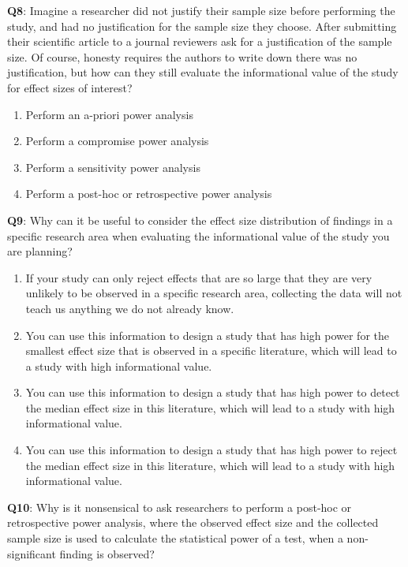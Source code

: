 \documentclass[
  oneside]{krantz}
\providecommand{\tightlist}{%
  \setlength{\itemsep}{0pt}\setlength{\parskip}{0pt}}
\begin{document}
\textbf{Q8}: Imagine a researcher did not justify their sample size before performing the study, and had no justification for the sample size they choose. After submitting their scientific article to a journal reviewers ask for a justification of the sample size. Of course, honesty requires the authors to write down there was no justification, but how can they still evaluate the informational value of the study for effect sizes of interest?

\begin{enumerate}
\def\labelenumi{\Alph{enumi})}
\tightlist
\item
  Perform an a-priori power analysis
\item
  Perform a compromise power analysis
\item
  Perform a sensitivity power analysis
\item
  Perform a post-hoc or retrospective power analysis
\end{enumerate}

\textbf{Q9}: Why can it be useful to consider the effect size distribution of findings in a specific research area when evaluating the informational value of the study you are planning?

\begin{enumerate}
\def\labelenumi{\Alph{enumi})}
\tightlist
\item
  If your study can only reject effects that are so large that they are very unlikely to be observed in a specific research area, collecting the data will not teach us anything we do not already know.
\item
  You can use this information to design a study that has high power for the smallest effect size that is observed in a specific literature, which will lead to a study with high informational value.
\item
  You can use this information to design a study that has high power to detect the median effect size in this literature, which will lead to a study with high informational value.
\item
  You can use this information to design a study that has high power to reject the median effect size in this literature, which will lead to a study with high informational value.
\end{enumerate}

\textbf{Q10}: Why is it nonsensical to ask researchers to perform a post-hoc or retrospective power analysis, where the observed effect size and the collected sample size is used to calculate the statistical power of a test, when a non-significant finding is observed?
\end{document}
